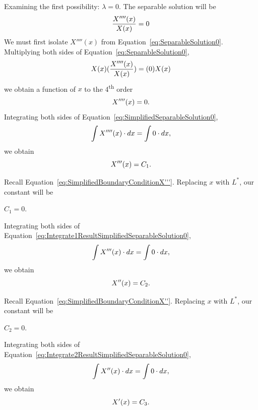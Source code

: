 \documentclass[12pt]{article}
\begin{document}
Examining the first possibility: $\lambda=0$. The separable solution will be
\begin{equation}\label{eq:SeparableSolution0}
    \centering
    \frac{X''''(x)}{X(x)} = 0
\end{equation}
We must first isolate $X''''(x)$ from Equation~\eqref{eq:SeparableSolution0}. Multiplying both sides of Equation~\eqref{eq:SeparableSolution0}, 
\begin{equation}\label{eq:SeparableSolution0CancelX}
    \centering
    X(x)(\frac{X''''(x)}{X(x)}) = (0)X(x)
\end{equation}
we obtain a function of $x$ to the 4\textsuperscript{th} order
\begin{equation}\label{eq:SimplifiedSeparableSolution0}
    \centering
    X''''(x) = 0.
\end{equation}
Integrating both sides of Equation~\eqref{eq:SimplifiedSeparableSolution0},
\begin{equation}\label{eq:Integrate1SimplifiedSeparableSolution0}
    \centering
    \int X''''(x)\cdot dx = \int0\cdot dx,
\end{equation}
we obtain
\begin{equation}\label{eq:Integrate1ResultSimplifiedSeparableSolution0}
    \centering
    X'''(x) = C_{1}.
\end{equation}

Recall Equation~\eqref{eq:SimplifiedBoundaryConditionX'''}. Replacing $x$ with $L^*$, our constant will be \\

\centerline{$C_1=0$.}

Integrating both sides of Equation~\eqref{eq:Integrate1ResultSimplifiedSeparableSolution0},
\begin{equation}\label{eq:Integrate2SimplifiedSeparableSolution0}
    \centering
    \int X'''(x)\cdot dx = \int0\cdot dx,
\end{equation}
we obtain
\begin{equation}\label{eq:Integrate2ResultSimplifiedSeparableSolution0}
    \centering
    X''(x) = C_{2}.
\end{equation}

Recall Equation~\eqref{eq:SimplifiedBoundaryConditionX''}. Replacing $x$ with $L^*$, our constant will be \\

\centerline{$C_2=0$.}

Integrating both sides of Equation~\eqref{eq:Integrate2ResultSimplifiedSeparableSolution0},
\begin{equation}\label{eq:Integrate3SimplifiedSeparableSolution0}
    \centering
    \int X''(x)\cdot dx = \int0\cdot dx,
\end{equation}
we obtain
\begin{equation}\label{eq:Integrate3ResultSimplifiedSeparableSolution0}
    \centering
    X'(x) = C_{3}.
\end{equation}
\end{document}
